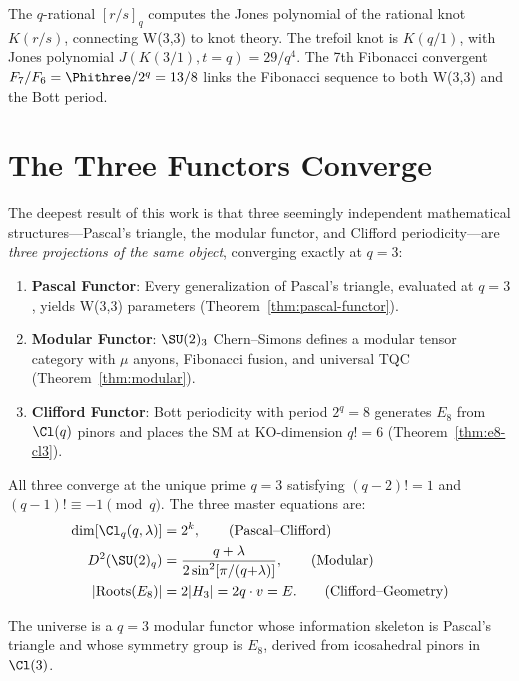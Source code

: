 The $q$-rational $[r/s]_q$ computes the Jones polynomial of
the rational knot $K(r/s)$, connecting W(3,3) to knot theory.
The trefoil knot is $K(q/1)$, with Jones polynomial
$J(K(3/1), t{=}q) = 29/q^4$.
The 7th Fibonacci convergent $F_7/F_6 = \Phithree/2^q = 13/8$
links the Fibonacci sequence to both W(3,3) and the Bott period.


\section{The Three Functors Converge}
\label{sec:three-functors}

The deepest result of this work is that three seemingly independent
mathematical structures---Pascal's triangle, the modular functor,
and Clifford periodicity---are \emph{three projections of the same
object}, converging exactly at $q=3$:

\begin{theorem}[Triple Convergence at $q=3$]
\label{thm:triple}
\begin{enumerate}[nosep]
\item \textbf{Pascal Functor}: Every generalization of Pascal's triangle,
  evaluated at $q=3$, yields W(3,3) parameters
  (Theorem~\ref{thm:pascal-functor}).
\item \textbf{Modular Functor}: $\SU(2)_3$ Chern--Simons defines a
  modular tensor category with $\mu$ anyons, Fibonacci fusion,
  and universal TQC (Theorem~\ref{thm:modular}).
\item \textbf{Clifford Functor}: Bott periodicity with period $2^q=8$
  generates $E_8$ from $\Cl(q)$ pinors and places the SM
  at KO-dimension $q!=6$ (Theorem~\ref{thm:e8-cl3}).
\end{enumerate}

All three converge at the unique prime $q=3$ satisfying
$(q{-}2)!=1$ and $(q{-}1)!\equiv -1\pmod{q}$.
The three master equations are:
\begin{align}
\dim[\Cl_q(q,\lambda)] &= 2^k, \tag{Pascal--Clifford} \\
D^2(\SU(2)_q) &= \frac{q+\lambda}{2\sin^2[\pi/(q{+}\lambda)]}, \tag{Modular} \\
|\mathrm{Roots}(E_8)| &= 2|H_3| = 2q\cdot v = E. \tag{Clifford--Geometry}
\end{align}
\end{theorem}

The universe is a $q=3$ modular functor whose information skeleton
is Pascal's triangle and whose symmetry group is $E_8$,
derived from icosahedral pinors in $\Cl(3)$.
